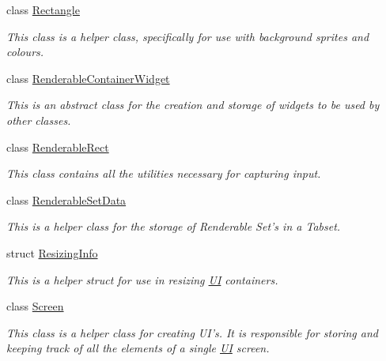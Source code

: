 \begin{DoxyCompactItemize}
class \hyperlink{classMezzanine_1_1UI_1_1Rectangle}{Rectangle}
\begin{DoxyCompactList}\small\item\em This class is a helper class, specifically for use with background sprites and colours. \item\end{DoxyCompactList}\item 
class \hyperlink{classMezzanine_1_1UI_1_1RenderableContainerWidget}{RenderableContainerWidget}
\begin{DoxyCompactList}\small\item\em This is an abstract class for the creation and storage of widgets to be used by other classes. \item\end{DoxyCompactList}\item 
class \hyperlink{structMezzanine_1_1UI_1_1RenderableRect}{RenderableRect}
\begin{DoxyCompactList}\small\item\em This class contains all the utilities necessary for capturing input. \item\end{DoxyCompactList}\item 
class \hyperlink{structMezzanine_1_1UI_1_1RenderableSetData}{RenderableSetData}
\begin{DoxyCompactList}\small\item\em This is a helper class for the storage of Renderable Set's in a Tabset. \item\end{DoxyCompactList}\item 
struct \hyperlink{structMezzanine_1_1UI_1_1ResizingInfo}{ResizingInfo}
\begin{DoxyCompactList}\small\item\em This is a helper struct for use in resizing \hyperlink{namespaceMezzanine_1_1UI}{UI} containers. \item\end{DoxyCompactList}\item 
class \hyperlink{classMezzanine_1_1UI_1_1Screen}{Screen}
\begin{DoxyCompactList}\small\item\em This class is a helper class for creating UI's. It is responsible for storing and keeping track of all the elements of a single \hyperlink{namespaceMezzanine_1_1UI}{UI} screen. \item\end{DoxyCompactList}\item 

\end{DoxyCompactItemize}
